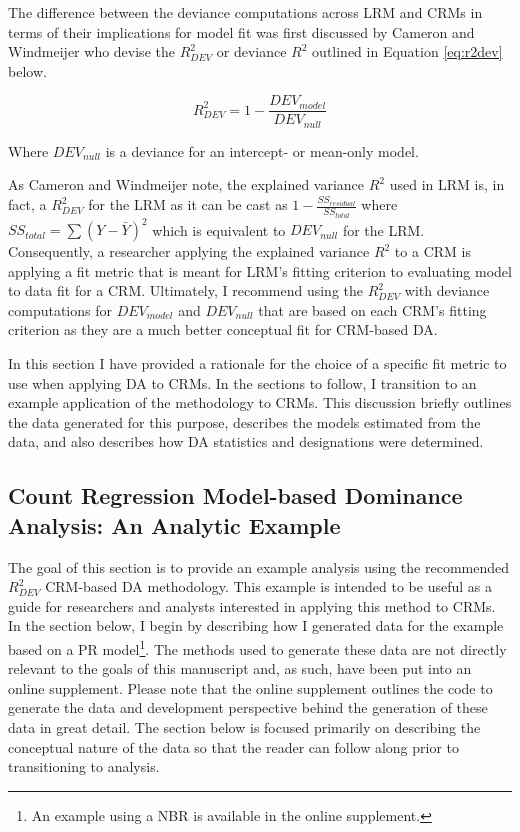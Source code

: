 \documentclass[man]{apa7}
\begin{document}
	The difference between the deviance computations across LRM and CRMs in terms of their implications for model fit was first discussed by Cameron and Windmeijer \parencite*{cameron1996r} who devise the $R^2_{DEV}$ or deviance $R^2$ outlined in Equation \ref{eq:r2dev} below.
	
	\begin{equation}
		R^{2}_{DEV} = 1 - \frac{DEV_{model}}{DEV_{null}}
		\label{eq:r2dev}
	\end{equation}
	
	Where $DEV_{null}$ is a deviance for an intercept- or mean-only model.
	
	As Cameron and Windmeijer note, the explained variance $R^2$ used in LRM is, in fact, a $R^2_{DEV}$ for the LRM as it can be cast as $1 - \frac{SS_{residual}}{SS_{total}}$ where $SS_{total} = \sum (Y - \bar{Y})^2$ which is equivalent to $DEV_{null}$ for the LRM.
	Consequently, a researcher applying the explained variance $R^2$ to a CRM is applying a fit metric that is meant for LRM's fitting criterion to evaluating model to data fit for a CRM.
	Ultimately, I recommend using the $R^{2}_{DEV}$ with deviance computations for $DEV_{model}$ and $DEV_{null}$ that are based on each CRM's fitting criterion as they are a much better conceptual fit for CRM-based DA.
	
	In this section I have provided a rationale for the choice of a specific fit metric to use when applying DA to CRMs.
	In the sections to follow, I transition to an example application of the methodology to CRMs.
	This discussion briefly outlines the data generated for this purpose, describes the models estimated from the data, and also describes how DA statistics and designations were determined.
	
	\subsection{Count Regression Model-based Dominance Analysis: An Analytic Example}
	
	The goal of this section is to provide an example analysis using the recommended $R^2_{DEV}$ CRM-based DA methodology.
	This  example is intended to be useful as a guide for researchers and analysts interested in applying this method to CRMs.
	In the section below, I begin by describing how I generated data for the example based on a PR model\footnote{
		An example using a NBR is available in the online supplement.}.
	The methods used to generate these data are not directly relevant to the goals of this manuscript and, as such, have been put into an online supplement.
	Please note that the online supplement outlines the code to generate the data and development perspective behind the generation of these data in great detail.
	The section below is focused primarily on describing the conceptual nature of the data so that the reader can follow along prior to transitioning to analysis.
	
\end{document}
